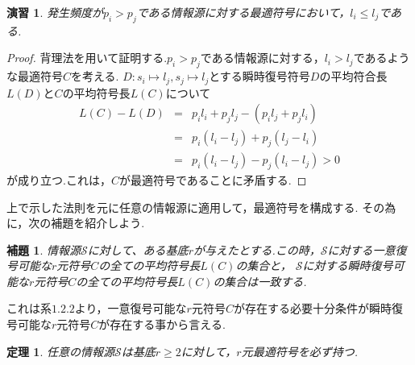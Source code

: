 \documentclass[12pt]{ltjsarticle}
\newtheorem{theorem}{定理}
\newtheorem{lemma}{補題}
\newtheorem{exercise}{演習}
\def \calS {\mathcal{S}}
\begin{document}
\begin{exercise}
    発生頻度が$p_i > p_j$である情報源に対する最適符号において，$l_i \leq l_j$である.
\end{exercise}

\begin{proof}
    背理法を用いて証明する.$p_i > p_j$である情報源に対する，$l_i > l_j$であるような最適符号$C$を考える.
    $D: s_i \longmapsto l_j,s_j \longmapsto l_j$とする瞬時復号符号$D$の平均符合長$L(D)$と$C$の平均符号長$L(C)$について
    \begin{eqnarray*}
        L(C) -L(D) &=& p_i l_i + p_j l_j - (p_i l_j + p_j l_i)\\
        &=&p_i(l_i - l_j) + p_j(l_j - l_i)\\
        &=&p_i(l_i-l_j) - p_j(l_i - l_j) > 0
    \end{eqnarray*}
    が成り立つ.これは，$C$が最適符号であることに矛盾する.
\end{proof}

上で示した法則を元に任意の情報源に適用して，最適符号を構成する.
その為に，次の補題を紹介しよう.
\begin{lemma}
    情報源$\calS$に対して、ある基底$r$が与えたとする.この時，$\calS$に対する一意復号可能な$r$元符号$C$の全ての平均符号長$L(C)$の集合と，
    $\calS$に対する瞬時復号可能な$r$元符号$C$の全ての平均符号長$L(C)$の集合は一致する.
\end{lemma}
これは系$1.2.2$より，一意復号可能な$r$元符号$C$が存在する必要十分条件が瞬時復号可能な$r$元符号$C$が存在する事から言える.

\begin{theorem}
    任意の情報源$\calS$は基底$r \geq 2$に対して，$r$元最適符号を必ず持つ.
\end{theorem}


\printbibliography[title=参考文献]
\end{document}
